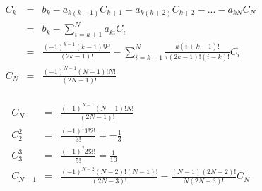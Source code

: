 \documentclass[a1paper]{article}
\begin{document}
\begin{eqnarray}
    C_k & = & b_k - a_{k(k+1)}C_{k+1} - a_{k(k+2)}C_{k+2} - ... - a_{kN}C_N \\
        & = & b_k - \sum \limits_{i=k+1}^N a_{ki}C_i \\
        & = & \frac  { (-1)^{k-1}  (k-1)! k! } { (2k-1)! }
             - \sum \limits_{i=k+1}^N  \frac  { k (i+k-1)! } { i(2k-1)!(i-k)! } C_i \\
    C_N & = & \frac  { (-1)^{N-1}  (N-1)! N! } { (2N-1)! } \\
\end{eqnarray}

\begin{eqnarray}
    C_N   & = & \frac  { (-1)^{N-1}  (N-1)! N! } { (2N-1)! } \\
    C_2^2 & = & \frac  { (-1)^1 1! 2! } {3!} = - \frac{1}{3} \\
    C_3^3 & = & \frac  { (-1)^2 2! 3! } {5!} =   \frac{1}{10} \\
    C_{N-1} & = & \frac  { (-1)^{N-2}  (N-2)! (N-1)! } { (2N-3)! }
                  -\frac  { (N-1) (2N-2)! } { N(2N-3)! } C_N\\
\end{eqnarray}
\end{document}
